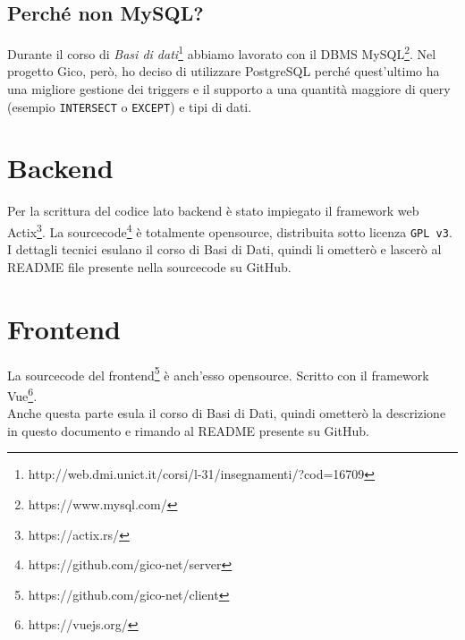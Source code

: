 \subsection{Perché non MySQL?}
Durante il corso di \textit{Basi di dati}\footnote{http://web.dmi.unict.it/corsi/l-31/insegnamenti/?cod=16709} abbiamo lavorato con il DBMS MySQL\footnote{https://www.mysql.com/}. Nel progetto Gico, però, ho deciso di utilizzare PostgreSQL perché quest'ultimo ha una migliore gestione dei triggers e il supporto a una quantità maggiore di query (esempio \verb|INTERSECT| o \verb|EXCEPT|) e tipi di dati.

\section{Backend}
Per la scrittura del codice lato backend è stato impiegato il framework web Actix\footnote{https://actix.rs/}. La sourcecode\footnote{https://github.com/gico-net/server} è totalmente opensource, distribuita sotto licenza \verb|GPL v3|.\\
I dettagli tecnici esulano il corso di Basi di Dati, quindi li ometterò e lascerò al README file presente nella sourcecode su GitHub.

\section{Frontend}
La sourcecode del frontend\footnote{https://github.com/gico-net/client} è anch'esso opensource. Scritto con il framework Vue\footnote{https://vuejs.org/}.\\
Anche questa parte esula il corso di Basi di Dati, quindi ometterò la descrizione in questo documento e rimando al README presente su GitHub.
